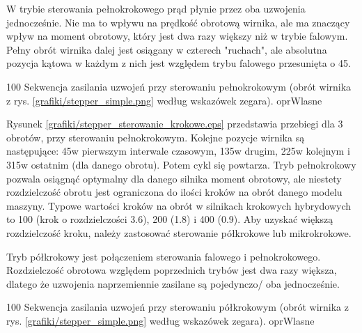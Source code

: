 \clearpage


W trybie sterowania pełnokrokowego prąd płynie przez oba uzwojenia jednocześnie. Nie ma to wpływu na prędkość obrotową wirnika, ale ma znaczący wpływ na moment obrotowy, który jest dwa razy większy niż w trybie falowym. Pełny obrót wirnika dalej jest osiągany w czterech "ruchach", ale absolutna pozycja kątowa w każdym z nich jest względem trybu falowego przesunięta o 45\degree.

		{100}
		{Sekwencja zasilania uzwojeń przy sterowaniu pełnokrokowym (obrót wirnika z rys. \ref{grafiki/stepper_simple.png} według wskazówek zegara).}
		{oprWlasne}
		
Rysunek \ref{grafiki/stepper_sterowanie_krokowe.eps} przedstawia przebiegi dla 3 obrotów, przy sterowaniu pełnokrokowym. Kolejne pozycje wirnika są następujące: 45\degree w pierwszym interwale czasowym, 135\degree w drugim, 225\degree w kolejnym i 315\degree w ostatnim (dla danego obrotu). Potem cykl się powtarza. Tryb pełnokrokowy pozwala osiągnąć optymalny dla danego silnika moment obrotowy, ale niestety rozdzielczość obrotu jest ograniczona do ilości kroków na obrót danego modelu maszyny. Typowe wartości kroków na obrót w silnikach krokowych hybrydowych to 100 (krok o rozdzielczości 3.6\degree), 200 (1.8\degree) i 400 (0.9\degree). Aby uzyskać większą rozdzielczość kroku, należy zastosować sterowanie półkrokowe lub mikrokrokowe.

\clearpage


Tryb półkrokowy jest połączeniem sterowania falowego i pełnokrokowego. Rozdzielczość obrotowa względem poprzednich trybów jest dwa razy większa, dlatego że uzwojenia naprzemiennie zasilane są pojedynczo/ oba jednocześnie.

		{100}
		{Sekwencja zasilania uzwojeń przy sterowaniu półkrokowym (obrót wirnika z rys. \ref{grafiki/stepper_simple.png} według wskazówek zegara).}
		{oprWlasne}
		
